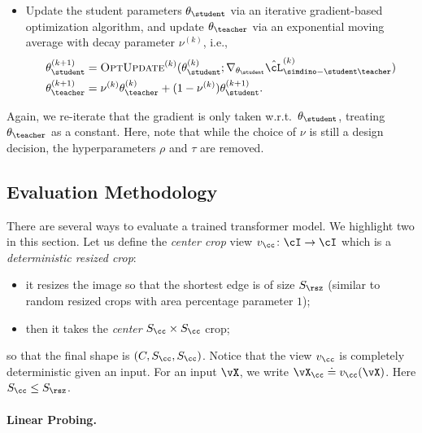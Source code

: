 \documentclass[../../book-main.tex]{subfiles}
\begin{document}
\begin{itemize}
    finite samples, described in . The
    gradient of \(\hat{\cL}_{\simdino-\student\teacher}^{(k)}\) with
    respect to \(\theta_{\student}\) should (again) be computed,
    under the assumption that \(\theta_{\teacher}\) is constant.
\item Update the student parameters \(\theta_{\student}\) via an
    iterative gradient-based optimization algorithm, and update
    \(\theta_{\teacher}\) via an exponential moving average with
    decay parameter \(\nu^{(k)}\), i.e.,
    \begin{align}
        \theta_{\student}^{(k + 1)}
        &= \textsc{OptUpdate}^{(k)}(\theta_{\student}^{(k)};
        \nabla_{\theta_{\student}}\hat{\cL}_{\simdino-\student\teacher}^{(k)})
        \\
        \theta_{\teacher}^{(k + 1)}
        &= \nu^{(k)}\theta_{\teacher}^{(k)} + (1 -
        \nu^{(k)})\theta_{\student}^{(k + 1)}.
    \end{align}
\end{itemize}
Again, we re-iterate that the gradient is only taken
w.r.t.~\(\theta_{\student}\), treating \(\theta_{\teacher}\) as a
constant. Here, note that while the choice of \(\nu\) is still a
design decision, the hyperparameters \(\rho\) and \(\tau\) are removed.

\subsection{Evaluation Methodology}\label{sub:contrastive_learning_evals}
There are several ways to evaluate a trained transformer model. We
highlight two in this section. Let us define the \textit{center crop}
view \(v_{\cc} \colon \cI \to \cI\) which is a \textit{deterministic
resized crop}:
\begin{itemize}
\item it resizes the image so that the shortest edge is of size
    \(S_{\rsz}\) (similar to random resized crops with area
    percentage parameter \(1\));
\item then it takes the \textit{center} \(S_{\cc} \times S_{\cc}\) crop;
\end{itemize}
so that the final shape is \((C, S_{\cc}, S_{\cc})\). Notice that the
view \(v_{\cc}\) is completely deterministic given an input. For an
input \(\vX\), we write \(\vX_{\cc} \doteq v_{\cc}(\vX)\). Here
\(S_{\cc} \leq S_{\rsz}\).

\paragraph{Linear Probing.}
\end{document}
